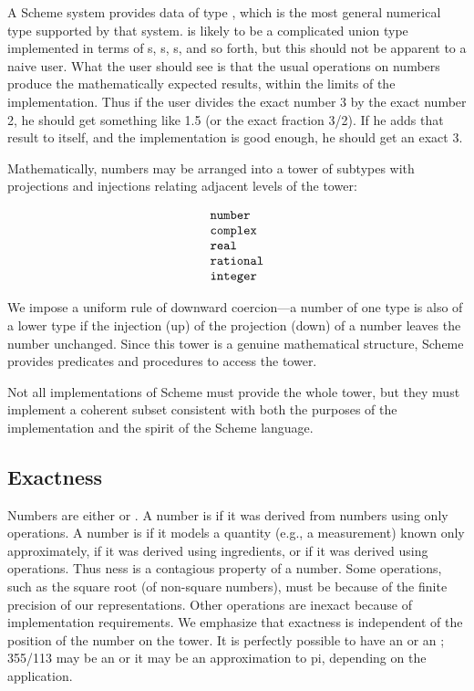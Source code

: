 A Scheme system provides data of type , which is the most
general numerical type supported by that system.   is likely
to be a complicated union type implemented in terms of s,
s, s, and so forth, but this should not be
apparent to a naive user.  What the user should see is that the usual
operations on numbers produce the mathematically expected results, within
the limits of the implementation.  Thus if the user divides the exact
number 3 by the exact number 2, he should get something like 1.5 (or the
exact fraction 3/2).  If he adds that result to itself, and the
implementation is good enough, he should get an exact 3.

\vest Mathematically, numbers may be arranged into a tower of subtypes with 
projections and injections relating adjacent levels of the tower:

$$\begin{tabular}{l}
\type{number} \\
\type{complex} \\
\type{real} \\
\type{rational} \\
\type{integer} 
\end{tabular} $$

We impose a uniform rule of downward coercion---a number of one type is
also of a lower type if the injection (up) of the projection (down) of a
number leaves the number unchanged.  Since this tower is a genuine
mathematical structure, Scheme provides predicates and procedures to access
the tower.

\vest Not all implementations of Scheme must provide the whole tower,
but they must implement a coherent subset consistent with both the
purposes of the implementation and the spirit of the Scheme language. 
 
 
\subsection{Exactness}

 \label{exactly}
Numbers are either  or .  A number is
 if it was derived from  numbers using only
 operations.  A number is  if it models a
quantity (e.g., a measurement) known only approximately, if it was
derived using  ingredients, or if it was derived using
 operations.
Thus ness is a contagious property of a number.  Some
operations, such as the square root (of non-square numbers), must be
 because of the finite precision of our representations.
Other operations are inexact because of implementation requirements.  We
emphasize that exactness is independent of the position of the number on
the tower.  It is perfectly possible to have an 
 or an  ; 355/113 may be an
  or it may be an 
 approximation to pi, depending on the application.

